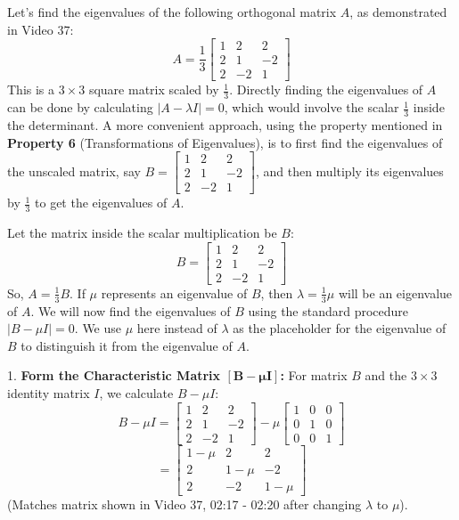 \documentclass{article}
\begin{document}
Let's find the eigenvalues of the following orthogonal matrix $A$, as demonstrated in Video 37:
\[ A = \frac{1}{3} \begin{bmatrix} 1 & 2 & 2 \\ 2 & 1 & -2 \\ 2 & -2 & 1 \end{bmatrix} \]
This is a $3 \times 3$ square matrix scaled by $\frac{1}{3}$. Directly finding the eigenvalues of $A$ can be done by calculating $|A - \lambda I| = 0$, which would involve the scalar $\frac{1}{3}$ inside the determinant. A more convenient approach, using the property mentioned in \textbf{Property 6} (Transformations of Eigenvalues), is to first find the eigenvalues of the unscaled matrix, say $B = \begin{bmatrix} 1 & 2 & 2 \\ 2 & 1 & -2 \\ 2 & -2 & 1 \end{bmatrix}$, and then multiply its eigenvalues by $\frac{1}{3}$ to get the eigenvalues of $A$.

Let the matrix inside the scalar multiplication be $B$:
\[ B = \begin{bmatrix} 1 & 2 & 2 \\ 2 & 1 & -2 \\ 2 & -2 & 1 \end{bmatrix} \]
So, $A = \frac{1}{3}B$. If $\mu$ represents an eigenvalue of $B$, then $\lambda = \frac{1}{3}\mu$ will be an eigenvalue of $A$. We will now find the eigenvalues of $B$ using the standard procedure $|B - \mu I|=0$. We use $\mu$ here instead of $\lambda$ as the placeholder for the eigenvalue of $B$ to distinguish it from the eigenvalue of $A$.

1.  \textbf{Form the Characteristic Matrix $\mathbf{[B - \mu I]}$:}
    For matrix $B$ and the $3 \times 3$ identity matrix $I$, we calculate $B - \mu I$:
    \[ B - \mu I = \begin{bmatrix} 1 & 2 & 2 \\ 2 & 1 & -2 \\ 2 & -2 & 1 \end{bmatrix} - \mu \begin{bmatrix} 1 & 0 & 0 \\ 0 & 1 & 0 \\ 0 & 0 & 1 \end{bmatrix} \]
    \[ = \begin{bmatrix} 1 - \mu & 2 & 2 \\ 2 & 1 - \mu & -2 \\ 2 & -2 & 1 - \mu \end{bmatrix} \]
    (Matches matrix shown in Video 37, 02:17 - 02:20 after changing $\lambda$ to $\mu$).
\end{document}
